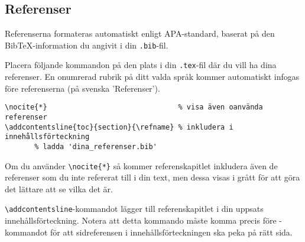 


\subsection{Referenser}

Referenserna formateras automatiskt enligt APA-standard, baserat på den
BibTeX-information du angivit i din \verb|.bib|-fil.

Placera följande kommandon på den plats i din \verb|.tex|-fil där du vill ha
dina referenser. En onumrerad rubrik på ditt valda språk kommer automatiskt
infogas före referenserna (på svenska 'Referenser').

\begin{verbatim}
\nocite{*}                               % visa även oanvända referenser
\addcontentsline{toc}{section}{\refname} % inkludera i innehållsförteckning
       % ladda 'dina_referenser.bib'
\end{verbatim}

Om du använder \verb|\nocite{*}| så kommer referenskapitlet inkludera även de
referenser som du inte refererat till i din text, men dessa visas i grått för
att göra det lättare att se vilka det är.

\verb|\addcontentsline|-kommandot lägger till referenskapitlet i din uppsats
innehållsförteckning. Notera att detta kommando måste komma precis före
\verb||-kommandot för att sidreferensen i innehållsförteckningen
ska peka på rätt sida.

